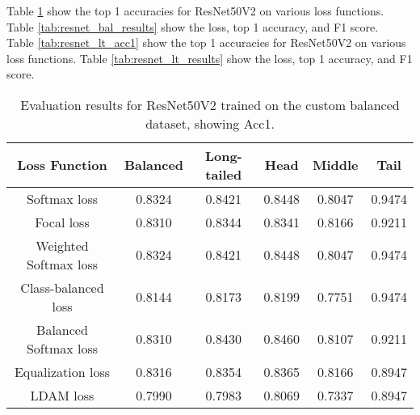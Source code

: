 Table \ref{tab:resnet_bal_acc1} show the top 1 accuracies for ResNet50V2 on various loss functions. Table \ref{tab:resnet_bal_results} show the loss, top 1 accuracy, and F1 score.\\

Table \ref{tab:resnet_lt_acc1} show the top 1 accuracies for ResNet50V2 on various loss functions. Table \ref{tab:resnet_lt_results} show the loss, top 1 accuracy, and F1 score. 

\begin{table}[H]
    \centering
    \begin{tabular}{cccccc}
        \toprule
        Loss Function & Balanced & Long-tailed & Head & Middle & Tail \\ 
        \midrule
        Softmax loss   & 0.8324  & 0.8421 & 0.8448 & 0.8047 & 0.9474 \\
        Focal loss   & 0.8310  & 0.8344 & 0.8341 & 0.8166 & 0.9211 \\
        Weighted Softmax loss   & 0.8324 & 0.8421 & 0.8448 & 0.8047 & 0.9474 \\
        Class-balanced loss   &  0.8144 & 0.8173 & 0.8199 & 0.7751 & 0.9474 \\
        Balanced Softmax loss   & 0.8310 & 0.8430 & 0.8460 & 0.8107 & 0.9211 \\
        Equalization loss   & 0.8316 & 0.8354 & 0.8365 & 0.8166 & 0.8947 \\
        LDAM loss   & 0.7990 & 0.7983 & 0.8069 & 0.7337 & 0.8947 \\
        \bottomrule
    \end{tabular}
    \caption{Evaluation results for ResNet50V2 trained on the custom balanced dataset, showing Acc1.}
    \label{tab:resnet_bal_acc1}
\end{table}

